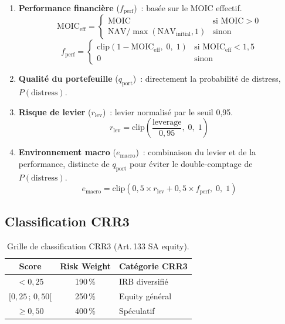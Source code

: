 \documentclass[12pt,a4paper]{article}
\begin{document}
\begin{enumerate}[nosep]
    \item \textbf{Performance financi\`ere} ($f_{\text{perf}}$)~: bas\'ee sur le MOIC effectif.
    \begin{equation}
        \text{MOIC}_{\text{eff}} = \begin{cases} \text{MOIC} & \text{si MOIC} > 0 \\ \text{NAV} / \max(\text{NAV}_{\text{initial}}, 1) & \text{sinon} \end{cases}
    \end{equation}
    \begin{equation}
        f_{\text{perf}} = \begin{cases} \text{clip}(1 - \text{MOIC}_{\text{eff}},\; 0,\; 1) & \text{si MOIC}_{\text{eff}} < 1{,}5 \\ 0 & \text{sinon} \end{cases}
    \end{equation}

    \item \textbf{Qualit\'e du portefeuille} ($q_{\text{port}}$)~: directement la probabilit\'e de distress, $P(\text{distress})$.

    \item \textbf{Risque de levier} ($r_{\text{lev}}$)~: levier normalis\'e par le seuil 0{,}95.
    \begin{equation}
        r_{\text{lev}} = \text{clip}\!\left(\frac{\text{leverage}}{0{,}95},\; 0,\; 1\right)
    \end{equation}

    \item \textbf{Environnement macro} ($e_{\text{macro}}$)~: combinaison du levier et de la performance, distincte de $q_{\text{port}}$ pour \'eviter le double-comptage de $P(\text{distress})$.
    \begin{equation}
        e_{\text{macro}} = \text{clip}\!\left(0{,}5 \times r_{\text{lev}} + 0{,}5 \times f_{\text{perf}},\; 0,\; 1\right)
    \end{equation}
\end{enumerate}

\subsection{Classification CRR3}

\begin{table}[h]
\centering
\begin{tabular}{ccl}
\toprule
\textbf{Score} & \textbf{Risk Weight} & \textbf{Cat\'egorie CRR3} \\
\midrule
$< 0{,}25$ & 190\,\% & IRB diversifi\'e \\
$[0{,}25\,;\, 0{,}50[$ & 250\,\% & Equity g\'en\'eral \\
$\geq 0{,}50$ & 400\,\% & Sp\'eculatif \\
\bottomrule
\end{tabular}
\caption{Grille de classification CRR3 (Art.\,133 SA equity).}
\label{tab:crr3_grid}
\end{table}
\end{document}
